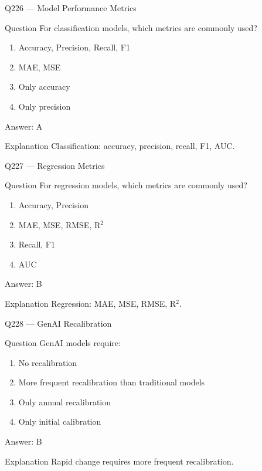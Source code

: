 \documentclass[aspectratio=169,8pt]{beamer}
\begin{document}
\begin{frame}{Q226 --- Model Performance Metrics}
\begin{block}{Question}
For classification models, which metrics are commonly used?
\begin{enumerate}
\item Accuracy, Precision, Recall, F1
\item MAE, MSE
\item Only accuracy
\item Only precision
\end{enumerate}
\end{block}
\begin{exampleblock}{Answer: A}\end{exampleblock}
\begin{block}{Explanation}
Classification: accuracy, precision, recall, F1, AUC.
\end{block}
\end{frame}

\begin{frame}{Q227 --- Regression Metrics}
\begin{block}{Question}
For regression models, which metrics are commonly used?
\begin{enumerate}
\item Accuracy, Precision
\item MAE, MSE, RMSE, R$^2$
\item Recall, F1
\item AUC
\end{enumerate}
\end{block}
\begin{exampleblock}{Answer: B}\end{exampleblock}
\begin{block}{Explanation}
Regression: MAE, MSE, RMSE, R$^2$.
\end{block}
\end{frame}

\begin{frame}{Q228 --- GenAI Recalibration}
\begin{block}{Question}
GenAI models require:
\begin{enumerate}
\item No recalibration
\item More frequent recalibration than traditional models
\item Only annual recalibration
\item Only initial calibration
\end{enumerate}
\end{block}
\begin{exampleblock}{Answer: B}\end{exampleblock}
\begin{block}{Explanation}
Rapid change requires more frequent recalibration.
\end{block}
\end{frame}
\end{document}
